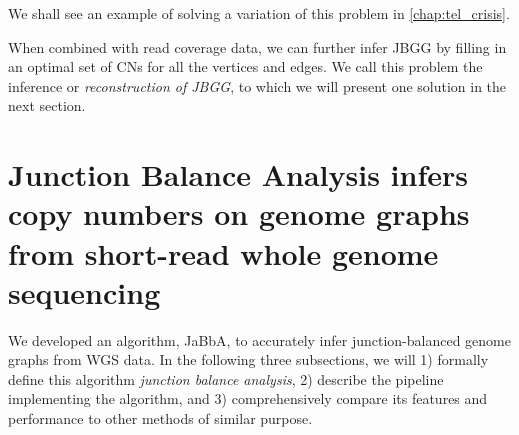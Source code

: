 \documentclass[phd,tocprelim]{cornell}
\begin{document}
We shall see an example of solving a variation of this problem in \ref{chap:tel_crisis}.

When combined with read coverage data, we can further infer JBGG by filling in an optimal set of CNs for all the vertices and edges. We call this problem the inference or \textit{reconstruction of JBGG}, to which we will present one solution in the next section.



\clearpage
\section{Junction Balance Analysis infers copy numbers on genome graphs from short-read whole genome sequencing}

We developed an algorithm, JaBbA, to accurately infer junction-balanced genome graphs from WGS data. In the following three subsections, we will 1) formally define this algorithm \textit{junction balance analysis}, 2) describe the pipeline implementing the algorithm, and 3) comprehensively compare its features and performance to other methods of similar purpose.
\end{document}

